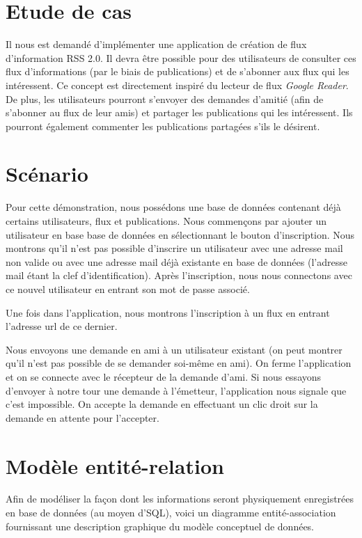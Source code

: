 \documentclass[a4paper,10pt]{article}
\begin{document}
\tableofcontents
\pagebreak

\section{Etude de cas}

Il nous est demandé d'implémenter une application de création de flux d'information RSS 2.0. Il devra être possible pour des utilisateurs de consulter ces flux d'informations (par le biais de publications) et de s'abonner aux flux qui les intéressent. Ce concept est directement inspiré du lecteur de flux \textsl{Google Reader}. De plus, les utilisateurs pourront s'envoyer des demandes d'amitié (afin de s'abonner au flux de leur amis) et partager les publications qui les intéressent. Ils pourront également commenter les publications partagées s'ils le désirent. 

\section{Scénario}

Pour cette démonstration, nous possédons une base de données contenant déjà certains utilisateurs, flux et publications. Nous commençons par ajouter un utilisateur en base base de données en sélectionnant le bouton d'inscription. Nous montrons qu'il n'est pas possible d'inscrire un utilisateur avec une adresse mail non valide ou avec une adresse mail déjà existante en base de données (l'adresse mail étant la clef d'identification). Après l'inscription, nous nous connectons avec ce nouvel utilisateur en entrant son mot de passe associé. 

Une fois dans l'application, nous montrons l'inscription à un flux en entrant l'adresse url de ce dernier.

Nous envoyons une demande en ami à un utilisateur existant (on peut montrer qu'il n'est pas possible de se demander soi-même en ami). On ferme l'application et on se connecte avec le récepteur de la demande d'ami. Si nous essayons d'envoyer à notre tour une demande à l'émetteur, l'application nous signale que c'est impossible. On accepte la demande en effectuant un clic droit sur la demande en attente pour l'accepter.

\section{Modèle entité-relation}

Afin de modéliser la façon dont les informations seront physiquement enregistrées en base de données (au moyen d'SQL), voici un diagramme entité-association fournissant une description graphique du modèle conceptuel de données.
\end{document}
